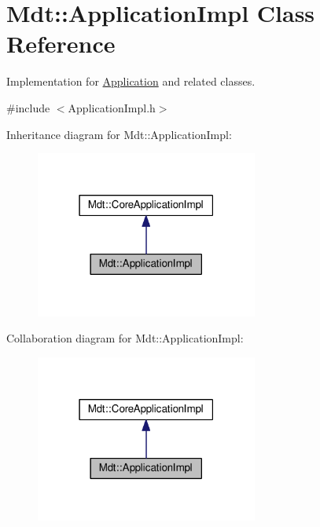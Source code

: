 \hypertarget{class_mdt_1_1_application_impl}{}\section{Mdt\+:\+:Application\+Impl Class Reference}
\label{class_mdt_1_1_application_impl}


Implementation for \hyperlink{class_mdt_1_1_application}{Application} and related classes.  




{\ttfamily \#include $<$Application\+Impl.\+h$>$}



Inheritance diagram for Mdt\+:\+:Application\+Impl\+:\nopagebreak
\begin{figure}[H]
\begin{center}
\leavevmode
\includegraphics[width=207pt]{class_mdt_1_1_application_impl__inherit__graph}
\end{center}
\end{figure}


Collaboration diagram for Mdt\+:\+:Application\+Impl\+:\nopagebreak
\begin{figure}[H]
\begin{center}
\leavevmode
\includegraphics[width=207pt]{class_mdt_1_1_application_impl__coll__graph}
\end{center}
\end{figure}
